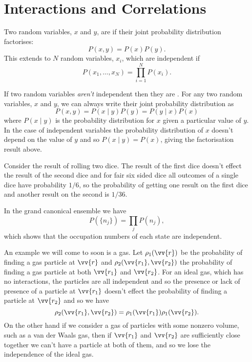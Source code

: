 \documentclass[fleqn]{NotesClass}
\begin{document}
    \section{Interactions and Correlations}
    Two random variables, \(x\) and \(y\), are  if their joint probability distribution factorises:
    \begin{equation}
        P(x, y) = P(x)P(y).
    \end{equation}
    This extends to \(N\) random variables, \(x_i\), which are independent if
    \begin{equation}
        P(x_1, \dotsc, x_N) = \prod_{i = 1}^{N} P(x_i).
    \end{equation}
    
    If two random variables \emph{aren't} independent then they are .
    For any two random variables, \(x\) and \(y\), we can always write their joint probability distribution as
    \begin{equation}
        P(x, y) = P(x \mid y)P(y) = P(y \mid x) P(x)
    \end{equation}
    where \(P(x \mid y)\) is the probability distribution for \(x\) given a particular value of \(y\).
    In the case of independent variables the probability distribution of \(x\) doesn't depend on the value of \(y\) and so \(P(x \mid y) = P(x)\), giving the factorisation result above.
    
    \begin{exm}{}{}
        Consider the result of rolling two dice.
        The result of the first dice doesn't effect the result of the second dice and for fair six sided dice all outcomes of a single dice have probability \(1/6\), so the probability of getting one result on the first dice and another result on the second is \(1/36\).
        
        In the grand canonical ensemble we have
        \begin{equation}
            P(\{n_j\}) = \prod_j P(n_j),
        \end{equation}
        which shows that the occupation numbers of each state are independent.
        
        An example we will come to soon is a gas.
        Let \(\rho_1(\vv{r})\) be the probability of finding a gas particle at \(\vv{r}\) and \(\rho_2(\vv{r_1}, \vv{r_2})\) the probability of finding a gas particle at both \(\vv{r_1}\) and \(\vv{r_2}\).
        For an ideal gas, which has no interactions, the particles are all independent and so the presence or lack of presence of a particle at \(\vv{r_1}\) doesn't effect the probability of finding a particle at \(\vv{r_2}\) and so we have
        \begin{equation}
            \rho_2(\vv{r_1}, \vv{r_2}) = \rho_1(\vv{r_1}) \rho_1(\vv{r_2}).
        \end{equation}
        On the other hand if we consider a gas of particles with some nonzero volume, such as a van der Waals gas, then if \(\vv{r_1}\) and \(\vv{r_2}\) are sufficiently close together we can't have a particle at both of them, and so we lose the independence of the ideal gas.
    \end{exm}
    
\end{document}

